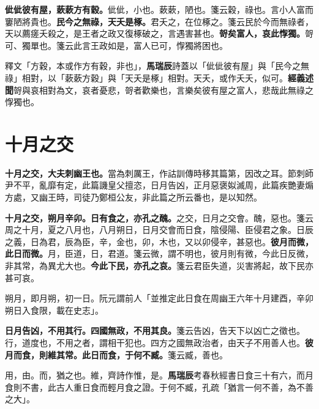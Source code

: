 \textbf{佌佌彼有屋，蔌蔌方有穀。}{\footnotesize 佌佌，小也。蔌蔌，陋也。箋云穀，祿也。言小人富而窶陋將貴也。}\textbf{民今之無祿，天夭是椓。}{\footnotesize 君夭之，在位椓之。箋云民於今而無祿者，天以薦瘥夭殺之，是王者之政又復椓破之，言遇害甚也。}\textbf{哿矣富人，哀此惸獨。}{\footnotesize 哿可、獨單也。箋云此言王政如是，富人已可，惸獨將困也。}

\begin{quoting}釋文「方穀，本或作方有穀，非也」，\textbf{馬瑞辰}詩蓋以「佌佌彼有屋」與「民今之無祿」相對，以「蔌蔌方穀」與「天夭是椓」相對。天夭，或作夭夭，似可。\textbf{經義述聞}哿與哀相對為文，哀者憂悲，哿者歡樂也，言樂矣彼有屋之富人，悲哉此無祿之惸獨也。\end{quoting}

\section{十月之交}


\textbf{十月之交，大夫刺幽王也。}{\footnotesize 當為刺厲王，作詁訓傳時移其篇第，因改之耳。節刺師尹不平，亂靡有定，此篇譏皇父擅恣，日月告凶，正月惡褒姒滅周，此篇疾艷妻煽方處，又幽王時，司徒乃鄭桓公友，非此篇之所云番也，是以知然。}

\textbf{十月之交，朔月辛卯。日有食之，亦孔之醜。}{\footnotesize 之交，日月之交會。醜，惡也。箋云周之十月，夏之八月也，八月朔日，日月交會而日食，陰侵陽、臣侵君之象。日辰之義，日為君，辰為臣，辛，金也，卯，木也，又以卯侵辛，甚惡也。}\textbf{彼月而微，此日而微。}{\footnotesize 月，臣道，日，君道。箋云微，謂不明也，彼月則有微，今此日反微，非其常，為異尤大也。}\textbf{今此下民，亦孔之哀。}{\footnotesize 箋云君臣失道，災害將起，故下民亦甚可哀。}

\begin{quoting}朔月，即月朔，初一日。阮元謂前人「並推定此日食在周幽王六年十月建酉，辛卯朔日入食限，載在史志」。\end{quoting}

\textbf{日月告凶，不用其行。四國無政，不用其良。}{\footnotesize 箋云告凶，告天下以凶亡之徵也。行，道度也，不用之者，謂相干犯也。四方之國無政治者，由天子不用善人也。}\textbf{彼月而食，則維其常。此日而食，于何不臧。}{\footnotesize 箋云臧，善也。}

\begin{quoting}用，由。而，猶之也。維，齊詩作惟，是。\textbf{馬瑞辰}考春秋經書日食三十有六，而月食則不書，此古人重日食而輕月食之證。于何不臧，孔疏「猶言一何不善，為不善之大」。\end{quoting}

